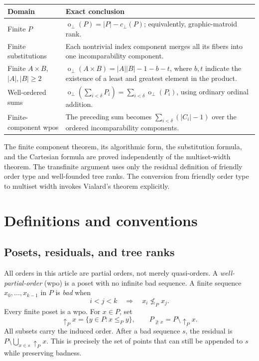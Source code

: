 \documentclass[11pt,a4paper]{article}
\theoremstyle{definition}
\theoremstyle{remark}
\newcommand{\fot}{\operatorname{o}_{\perp}}
\newcommand{\cc}{c_{\perp}}
\newcommand{\res}[2]{#1_{\not\ge #2}}
\begin{document}
\begin{center}
\renewcommand{\arraystretch}{1.2}
\begin{tabular}{@{}p{}p{}@{}}
\toprule
Domain & Exact conclusion \\
\midrule
Finite $P$ & $\fot(P)=|P|-\cc(P)$; equivalently, graphic-matroid rank. \\
Finite substitutions & Each nontrivial index component merges all its fibers into one incomparability component. \\
Finite $A\times B$, $|A|,|B|\ge2$ & $\fot(A\times B)=|A||B|-1-b-t$, where $b,t$ indicate the existence of a least and greatest element in the product. \\
Well-ordered sums & $\fot(\sum_{i<\delta}P_i)=\sum_{i<\delta}\fot(P_i)$, using ordinary ordinal addition. \\
Finite-component wpos & The preceding sum becomes $\sum_{i<\delta}(|C_i|-1)$ over the ordered incomparability components. \\
\bottomrule
\end{tabular}
\end{center}

The finite component theorem, its algorithmic form, the substitution formula,
and the Cartesian formula are proved independently of the multiset-width
theorem. The transfinite argument uses only the residual definition of
friendly order type and well-founded tree ranks. The conversion from friendly
order type to multiset width invokes Vialard's theorem explicitly.

\section{Definitions and conventions}

\subsection{Posets, residuals, and tree ranks}

All orders in this article are partial orders, not merely quasi-orders.
A \emph{well-partial-order} (wpo) is a poset with no infinite bad sequence.
A finite sequence $x_0,\ldots,x_{k-1}$ in $P$ is \emph{bad} when
\[
 i<j<k\quad\Longrightarrow\quad x_i\not\le_P x_j.
\]
Every finite poset is a wpo. For $x\in P$, set
\[
 \uparrow_P x=\{y\in P:x\le_P y\},\qquad
 \res{P}{x}=P\setminus\uparrow_P x.
\]
All subsets carry the induced order. After a bad sequence $s$, the residual
is $P\setminus\bigcup_{x\in s}\uparrow_P x$. This is precisely the set of
points that can still be appended to $s$ while preserving badness.
\end{document}
